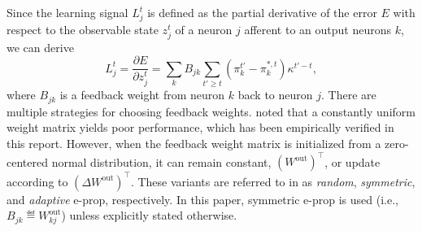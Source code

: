             Since the learning signal $L^t_j$ is defined as the partial derivative of the error $E$ with respect to the observable state $z_j^t$ of a neuron $j$ afferent to an output neurons $k$, we can derive
            \begin{equation}\label{eq:learningsignal_after_output}
            L^t_j = \frac{\partial E}{\partial z^t_j} = \sum_kB_{jk}\sum_{t'\geq t}\left(\pi^{t'}_k - \pi^{*,t}_k\right)\kappa^{t'-t},
            \end{equation}
            where $B_{jk}$ is a feedback weight from neuron $k$ back to neuron $j$.
            There are multiple strategies for choosing feedback weights.
            \citet{bellec2020solution} noted that a constantly uniform weight matrix yields poor performance, which has been empirically verified in this report.
            However, when the feedback weight matrix is initialized from a zero-centered normal distribution, it can remain constant, $(W^\text{out})^\top$, or update according to $(\Delta W^\text{out})^\top$.
            These variants are referred to in \citet{bellec2020solution} as \emph{random}, \emph{symmetric}, and \emph{adaptive} e-prop, respectively.
            In this paper, symmetric e-prop is used (i.e., $B_{jk} \eqdef W^\text{out}_{kj}$) unless explicitly stated otherwise.

